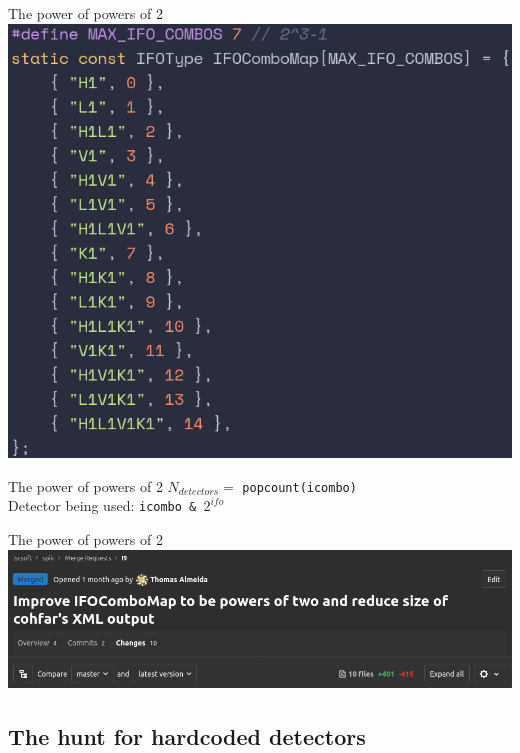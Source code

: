 \documentclass{beamer}
\begin{document}
\begin{frame}{The power of powers of 2}
    \centering
    \includegraphics[height=0.75\textheight]{new-icombo-add.png}
\end{frame}

\begin{frame}{The power of powers of 2}
    \centering
    \large{\(N_{detectors} = \) \texttt{popcount(icombo)}}\\
    \large{Detector being used: \texttt{icombo \& \(2^{ifo}\)}}
\end{frame}

\begin{frame}{The power of powers of 2}
    \centering
    \includegraphics[width=\textwidth]{new-icombo-lines.png}
\end{frame}

\subsection{The hunt for hardcoded detectors}
\end{document}
